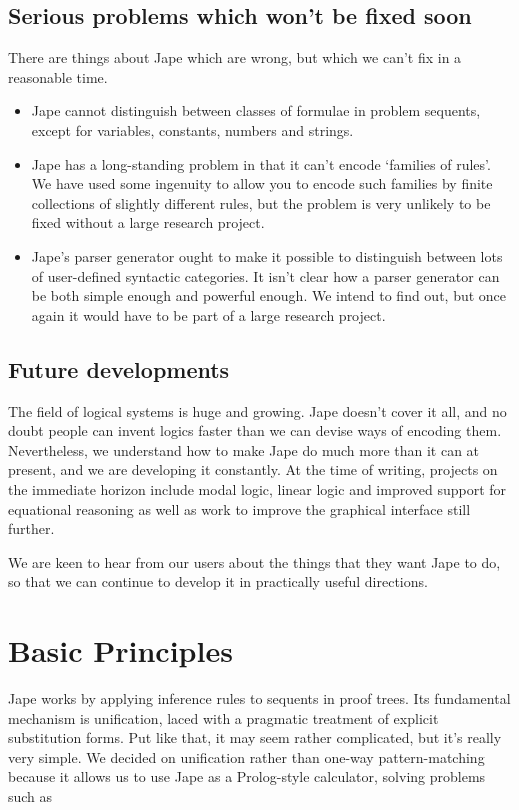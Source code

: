 \documentclass[11pt]{book}
\begin{document}
\section*{Serious problems which won't be fixed soon}

There are things about Jape which are wrong, but which we can't fix in a reasonable time.
\begin{itemize}
\item Jape cannot distinguish between classes of formulae in problem sequents, except for variables, constants, numbers and strings.
\item Jape has a long-standing problem in that it can't encode `families of rules'. We have used some ingenuity to allow you to encode such families by finite collections of slightly different rules, but the problem is very unlikely to be fixed without a large research project.
\item Jape's parser generator ought to make it possible to distinguish between lots of user-defined syntactic categories. It isn't clear how a parser generator can be both simple enough and powerful enough. We intend to find out, but once again it would have to be part of a large research project.
\end{itemize}


\section*{Future developments}

The field of logical systems is huge and growing. Jape doesn't cover it all, and no doubt people can invent logics faster than we can devise ways of encoding them. Nevertheless, we understand how to make Jape do much more than it can at present, and we are developing it constantly. At the time of writing, projects on the immediate horizon include modal logic, linear logic and improved support for equational reasoning as well as work to improve the graphical interface still further.

We are keen to hear from our users about the things that they want Jape to do, so that we can continue to develop it in practically useful directions.

\tableofcontents


\chapter{Basic Principles}


Jape works by applying inference rules to sequents in proof trees. Its fundamental mechanism is unification, laced with a pragmatic treatment of explicit substitution forms. Put like that, it may seem rather complicated, but it's really very simple. We decided on unification rather than one-way pattern-matching because it allows us to use Jape as a Prolog-style calculator, solving problems such as
\end{document}
